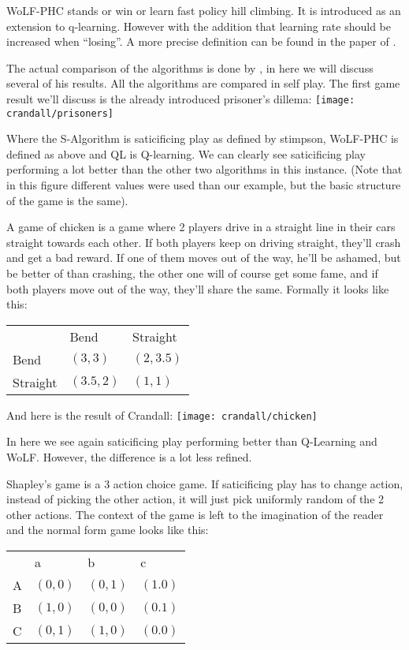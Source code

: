 WoLF-PHC stands or win or learn fast policy hill climbing. It is 
introduced as an extension to q-learning. However with the addition that
learning rate should be increased when ``losing''. A more precise definition
can be found in the paper of \citep{bowling}.

The actual comparison of the algorithms is done by \citep{crandall}, in here
we will discuss several of his results. All the algorithms are compared in self
play. The first game result we'll discuss
is the already introduced prisoner's dillema:
\texttt{[image: crandall/prisoners]}

Where the S-Algorithm is saticificing play as defined by stimpson, WoLF-PHC is
defined as above and QL is Q-learning. We can clearly see saticificing play
performing a lot better than the other two algorithms in this instance.
(Note that in this figure different values were used than our example, but
the basic structure of the game is the same).

A game of chicken is a game where 2 players drive in a straight line in their
cars straight towards each other. If both players keep on driving straight,
they'll crash and get a bad reward. If one of them moves out of the way, he'll
be ashamed, but be better of than crashing, the other one will of course get
some fame, and if both players move out of the way, they'll share the same.
Formally it looks like this:

\begin{tabular}{lll}
              & Bend & Straight \\
    Bend & $(3,3)$     & $(2,3.5)$  \\
    Straight & $(3.5,2)$     & $(1,1)$  \\
\end{tabular}

And here is the result of Crandall:
\texttt{[image: crandall/chicken]}

In here we see again saticificing play performing better than Q-Learning and
WoLF. However, the difference is a lot less refined.

Shapley's game is a 3 action choice game. If saticificing play has to change
action, instead of picking the other action, it will just pick uniformly random
of the 2 other actions. The context of the game is left to the imagination
of the reader and the normal form game looks like this:

\begin{tabular}{llll}
              & a & b & c \\
    A & $(0,0)$ & $(0,1)$     & $(1.0)$  \\
    B & $(1,0)$ & $(0,0)$     & $(0.1)$  \\
    C & $(0,1)$ & $(1,0)$     & $(0.0)$  \\
\end{tabular}

